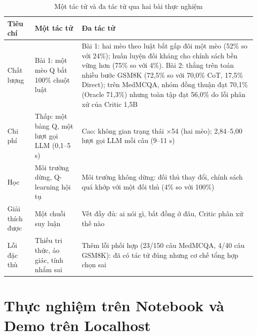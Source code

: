 \begin{table}[H]
\centering
\caption{Một tác tử và đa tác tử qua hai bài thực nghiệm}
\label{tab:ch7-single-multi}
\small
\begin{tabularx}{\linewidth}{@{}L{3.0cm}YY@{}}
\toprule
\textbf{Tiêu chí} & \textbf{Một tác tử} & \textbf{Đa tác tử} \\
\midrule
Chất lượng & Bài 1: một mèo Q bắt 100\% chuột luật & Bài 1: hai mèo theo luật bắt gấp đôi một mèo (52\% so với 24\%); huấn luyện đối kháng cho chính sách bền vững hơn (75\% so với 4\%). Bài 2: thắng trên toán nhiều bước GSM8K (72,5\% so với 70,0\% CoT, 17,5\% Direct); trên MedMCQA, nhóm đồng thuận đạt 70,1\% (Oracle 71,3\%) nhưng toàn tập đạt 56,0\% do lỗi phân xử của Critic 1,5B \\
Chi phí & Thấp: một bảng Q, một lượt gọi LLM (0,1–5 s) & Cao: không gian trạng thái ×54 (hai mèo); 2,84–5,00 lượt gọi LLM mỗi câu (9–11 s) \\
Học & Môi trường dừng, Q-learning hội tụ & Môi trường không dừng: đối thủ thay đổi, chính sách quá khớp với một đối thủ (4\% so với 100\%) \\
Giải thích được & Một chuỗi suy luận & Vết đầy đủ: ai nói gì, bất đồng ở đâu, Critic phân xử thế nào \\
Lỗi đặc thù & Thiếu tri thức, ảo giác, tính nhẩm sai & Thêm lỗi phối hợp (23/150 câu MedMCQA, 4/40 câu GSM8K): đã có tác tử đúng nhưng cơ chế tổng hợp chọn sai \\
\bottomrule
\end{tabularx}
\end{table}

\section{Thực nghiệm trên Notebook và Demo trên Localhost}
\label{sec:ch7-demo}

